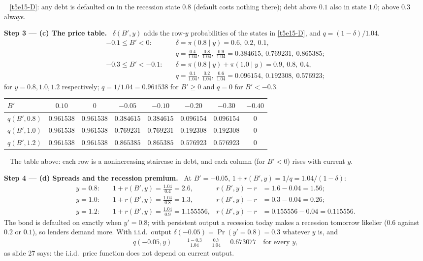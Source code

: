 \documentclass[11pt,a4paper]{article}
\newcommand{\step}[2]{\par\medskip\noindent\textbf{Step #1 --- #2.}~}
\newcommand{\answer}[1]{\par\smallskip\noindent\fbox{\textbf{Answer #1.}}~}
\begin{document}
\answer{(b)} \eqref{t5e15-D}: any debt is defaulted on in the recession state $0.8$ (default costs nothing there); debt above $0.1$ also in state $1.0$; above $0.3$ always.

\step{3}{(c) The price table} $\delta(B',y)$ adds the row-$y$ probabilities of the states in \eqref{t5e15-D}, and $q=(1-\delta)/1.04$.
\begin{align}
  -0.1\le B'<0:&\quad \delta = \pi(0.8\mid y) = 0.6,\ 0.2,\ 0.1, \nonumber\\
               &\quad q = \tfrac{0.4}{1.04},\ \tfrac{0.8}{1.04},\ \tfrac{0.9}{1.04} = 0.384615,\ 0.769231,\ 0.865385; \nonumber\\
  -0.3\le B'<-0.1:&\quad \delta = \pi(0.8\mid y)+\pi(1.0\mid y) = 0.9,\ 0.8,\ 0.4, \nonumber\\
                  &\quad q = \tfrac{0.1}{1.04},\ \tfrac{0.2}{1.04},\ \tfrac{0.6}{1.04} = 0.096154,\ 0.192308,\ 0.576923; \nonumber
\end{align}
for $y=0.8,1.0,1.2$ respectively; $q=1/1.04=0.961538$ for $B'\ge0$ and $q=0$ for $B'<-0.3$.

\begin{center}
\begin{tabular}{lccccccc}
\toprule
$B'$ & $0.10$ & $0$ & $-0.05$ & $-0.10$ & $-0.20$ & $-0.30$ & $-0.40$\\
\midrule
$q(B',0.8)$ & $0.961538$ & $0.961538$ & $0.384615$ & $0.384615$ & $0.096154$ & $0.096154$ & $0$\\
$q(B',1.0)$ & $0.961538$ & $0.961538$ & $0.769231$ & $0.769231$ & $0.192308$ & $0.192308$ & $0$\\
$q(B',1.2)$ & $0.961538$ & $0.961538$ & $0.865385$ & $0.865385$ & $0.576923$ & $0.576923$ & $0$\\
\bottomrule
\end{tabular}
\end{center}

\answer{(c)} The table above: each row is a nonincreasing staircase in debt, and each column (for $B'<0$) rises with current $y$.

\step{4}{(d) Spreads and the recession premium} At $B'=-0.05$, $1+r(B',y)=1/q=1.04/(1-\delta)$:
\begin{align}
  y=0.8:&\quad 1+r(B',y)=\tfrac{1.04}{0.4}=2.6, & r(B',y)-r&=1.6-0.04=1.56; \nonumber\\
  y=1.0:&\quad 1+r(B',y)=\tfrac{1.04}{0.8}=1.3, & r(B',y)-r&=0.3-0.04=0.26; \nonumber\\
  y=1.2:&\quad 1+r(B',y)=\tfrac{1.04}{0.9}=1.155556, & r(B',y)-r&=0.155556-0.04=0.115556. \nonumber
\end{align}
The bond is defaulted on exactly when $y'=0.8$; with persistent output a recession today makes a recession tomorrow likelier ($0.6$ against $0.2$ or
$0.1$), so lenders demand more. With i.i.d.\ output $\delta(-0.05)=\Pr(y'=0.8)=0.3$ whatever $y$ is, and
\begin{align}
  q(-0.05,y) &= \frac{1-0.3}{1.04} = \frac{0.7}{1.04} = 0.673077 \quad\text{for every } y, \nonumber
\end{align}
as slide 27 says: the i.i.d.\ price function does not depend on current output.
\end{document}
